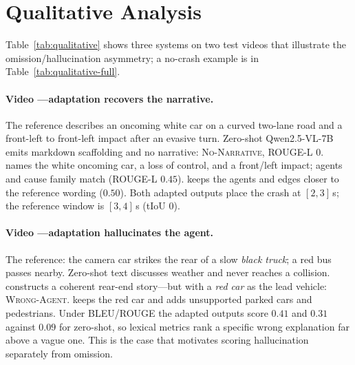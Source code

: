 \section{Qualitative Analysis}
\label{sec:qual}

Table~\ref{tab:qualitative} shows three systems on two test videos that illustrate the omission/hallucination asymmetry; a no-crash example is in Table~\ref{tab:qualitative-full}.



\paragraph{Video ---adaptation recovers the narrative.}
The reference describes an oncoming white car on a curved two-lane road and a front-left to front-left impact after an evasive turn.
Zero-shot Qwen2.5-VL-7B emits markdown scaffolding and no narrative: \textsc{No-Narrative}, ROUGE-L $0$.
\crashlogic{} names the white oncoming car, a loss of control, and a front/left impact; agents and cause family match (ROUGE-L $0.45$).
\tcd{} keeps the agents and edges closer to the reference wording ($0.50$).
Both adapted outputs place the crash at $[2,3]$\,s; the reference window is $[3,4]$\,s (tIoU $0$).

\paragraph{Video ---adaptation hallucinates the agent.}
The reference: the camera car strikes the rear of a slow \emph{black truck}; a red bus passes nearby.
Zero-shot text discusses weather and never reaches a collision.
\crashlogic{} constructs a coherent rear-end story---but with a \emph{red car} as the lead vehicle: \textsc{Wrong-Agent}.
\tcd{} keeps the red car and adds unsupported parked cars and pedestrians.
Under BLEU/ROUGE the adapted outputs score $0.41$ and $0.31$ against $0.09$ for zero-shot, so lexical metrics rank a specific wrong explanation far above a vague one.
This is the case that motivates scoring hallucination separately from omission.
